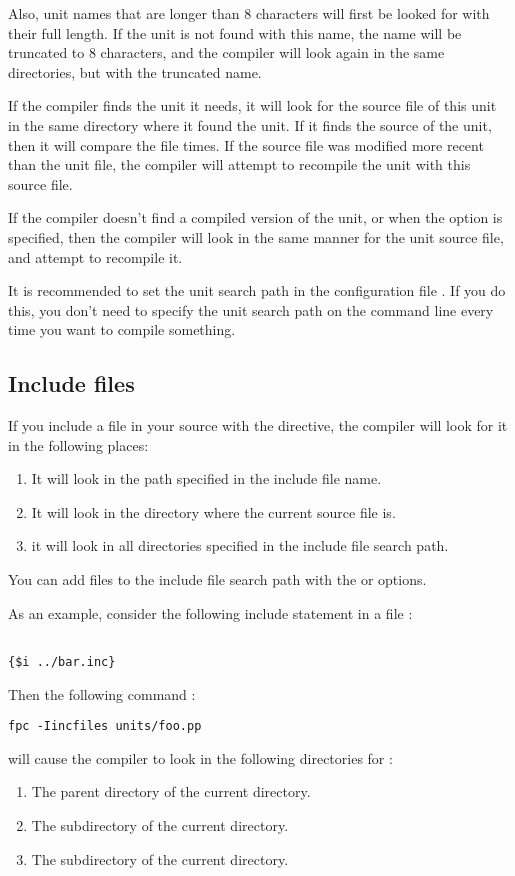Also, unit names that are longer than 8 characters will first be looked for
with their full length. If the unit is not found with this name, the name
will be truncated to 8 characters, and the compiler will look again in the
same directories, but with the truncated name.


If the compiler finds the unit it needs, it will look for the source file of
this unit in the same directory where it found the unit.
If it finds the source of the unit, then it will compare the file times.
If the source file was modified more recent than the unit file, the
compiler will attempt to recompile the unit with this source file.

If the compiler doesn't find a compiled version of the unit, or when the
 option is specified, then the compiler will look in the same
manner for the unit source file, and attempt to recompile it.

It is recommended to set the unit search path in the configuration file
. If you do this, you don't need to specify the unit search
path on the command line every time you want to compile something.

\subsection{Include files}
If you include a file in your source with the 
directive, the compiler will look for it in the following places:

\begin{enumerate}
\item It will look in the path specified in the include file name.
\item It will look in the directory where the current source file is.
\item it will look in all directories specified in the include file search
path.
\end{enumerate}
You can add files to the include file search path with the  or
 options.

As an example, consider the following include statement in a file
:
\begin{verbatim}

{$i ../bar.inc}

\end{verbatim}
Then the following command :
\begin{verbatim}
fpc -Iincfiles units/foo.pp
\end{verbatim}
will cause the compiler to look in the following directories for
:
\begin{enumerate}
\item The parent directory of the current directory.
\item The  subdirectory of the current directory.
\item The  subdirectory of the current directory.
\end{enumerate}

